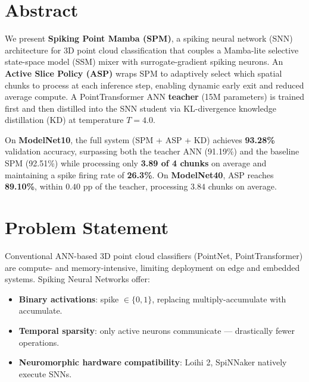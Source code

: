 \documentclass[11pt,a4paper]{article}
\begin{document}
\tableofcontents
\newpage

\section{Abstract}

We present \textbf{Spiking Point Mamba (SPM)}, a spiking neural network (SNN) architecture for 3D point cloud classification that couples a Mamba-lite selective state-space model (SSM) mixer with surrogate-gradient spiking neurons. An \textbf{Active Slice Policy (ASP)} wraps SPM to adaptively select which spatial chunks to process at each inference step, enabling dynamic early exit and reduced average compute. A PointTransformer ANN \textbf{teacher} (15M parameters) is trained first and then distilled into the SNN student via KL-divergence knowledge distillation (KD) at temperature $T=4.0$.

On \textbf{ModelNet10}, the full system (SPM + ASP + KD) achieves \textbf{93.28\%} validation accuracy, surpassing both the teacher ANN (91.19\%) and the baseline SPM (92.51\%) while processing only \textbf{3.89 of 4 chunks} on average and maintaining a spike firing rate of \textbf{26.3\%}. On \textbf{ModelNet40}, ASP reaches \textbf{89.10\%}, within $0.40$ pp of the teacher, processing $3.84$ chunks on average.

\section{Problem Statement}

Conventional ANN-based 3D point cloud classifiers (PointNet, PointTransformer) are compute- and memory-intensive, limiting deployment on edge and embedded systems. Spiking Neural Networks offer:
\begin{itemize}
  \item \textbf{Binary activations}: spike $\in \{0,1\}$, replacing multiply-accumulate with accumulate.
  \item \textbf{Temporal sparsity}: only active neurons communicate — drastically fewer operations.
  \item \textbf{Neuromorphic hardware compatibility}: Loihi 2, SpiNNaker natively execute SNNs.
\end{itemize}
\end{document}
